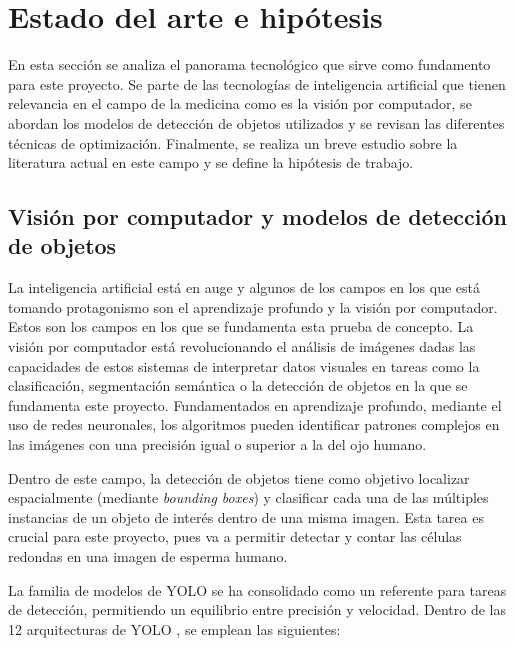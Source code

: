 \documentclass[12pt,a4paper,onecolumn,oneside]{report}
\begin{document}
\section{Estado del arte e hipótesis}
\label{sec:Estado del arte e hipótesis}

En esta sección se analiza el panorama tecnológico que sirve como fundamento para este proyecto. Se parte de las tecnologías de inteligencia artificial que tienen relevancia en el campo de la medicina como es la 
visión por computador, se abordan los modelos de detección de objetos utilizados y se revisan las diferentes técnicas de optimización. Finalmente, se realiza un breve estudio sobre la literatura actual 
en este campo y se define la hipótesis de trabajo.

\subsection{Visión por computador y modelos de detección de objetos}

La inteligencia artificial está en auge y algunos de los campos en los que está tomando protagonismo son el aprendizaje profundo y la visión por computador. Estos son los campos en los que se fundamenta esta prueba de concepto.
La visión por computador está revolucionando el análisis de imágenes dadas las capacidades de estos sistemas de interpretar datos visuales en tareas como la clasificación, segmentación semántica o la detección de objetos en la que se fundamenta este proyecto.
Fundamentados en aprendizaje profundo, mediante el uso de redes neuronales, los algoritmos pueden identificar patrones complejos en las imágenes con una precisión igual o superior a la del ojo humano. 

Dentro de este campo, la detección de objetos tiene como objetivo localizar espacialmente (mediante \textit{bounding boxes}) y clasificar cada una de las múltiples instancias de un objeto de interés dentro de una misma imagen.
Esta tarea es crucial para este proyecto, pues va a permitir detectar y contar las células redondas en una imagen de esperma humano.

La familia de modelos de YOLO \cite{ultralytics_models} se ha consolidado como un referente para tareas de detección, permitiendo un equilibrio entre precisión y velocidad.
Dentro de las 12 arquitecturas de YOLO \cite{ultralytics_models}, se emplean las siguientes:
\end{document}
